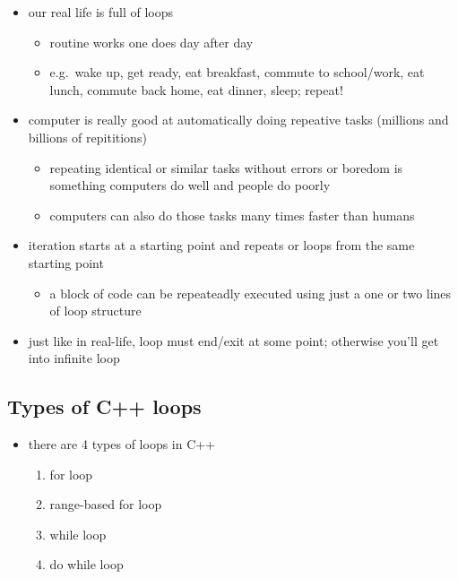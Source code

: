 \documentclass[11pt]{article}
\providecommand{\tightlist}{%
      \setlength{\itemsep}{0pt}\setlength{\parskip}{0pt}}
\begin{document}
\begin{itemize}
\tightlist
\item
  our real life is full of loops

  \begin{itemize}
  \tightlist
  \item
    routine works one does day after day
  \item
    e.g.~wake up, get ready, eat breakfast, commute to school/work, eat
    lunch, commute back home, eat dinner, sleep; repeat!
  \end{itemize}
\item
  computer is really good at automatically doing repeative tasks
  (millions and billions of repititions)

  \begin{itemize}
  \tightlist
  \item
    repeating identical or similar tasks without errors or boredom is
    something computers do well and people do poorly
  \item
    computers can also do those tasks many times faster than humans
  \end{itemize}
\item
  iteration starts at a starting point and repeats or loops from the
  same starting point

  \begin{itemize}
  \tightlist
  \item
    a block of code can be repeateadly executed using just a one or two
    lines of loop structure
  \end{itemize}
\item
  just like in real-life, loop must end/exit at some point; otherwise
  you'll get into infinite loop
\end{itemize}

\hypertarget{types-of-c-loops}{%
\subsection{Types of C++ loops}\label{types-of-c-loops}}

\begin{itemize}
\tightlist
\item
  there are 4 types of loops in C++

  \begin{enumerate}
  \def\labelenumi{\arabic{enumi}.}
  \tightlist
  \item
    for loop
  \item
    range-based for loop
  \item
    while loop
  \item
    do while loop
  \end{enumerate}
\end{itemize}
\end{document}
